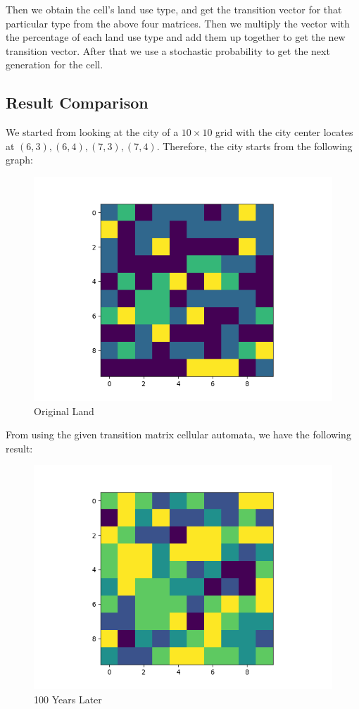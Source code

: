 \documentclass[a4paper,12pt]{report}
\begin{document}
\pagebreak
Then we obtain the cell's land use type, and get the transition vector for that particular type from the above four matrices. Then we multiply the vector with the percentage of each land use type and add them up together to get the new transition vector. After that we use a stochastic probability to get the next generation for the cell.  

\subsection{Result Comparison}

We started from looking at the city of a $10\times 10$ grid with the city center locates at $(6,3), (6,4), (7,3), (7,4)$. Therefore, the city starts from the following graph:

\begin{figure}[h]
\centering
\includegraphics[scale=0.6]{../output/Original.png}
\caption{Original Land}
\end{figure}

\pagebreak
From using the given transition matrix cellular automata, we have the following result:

\begin{figure}[h]
\centering
\includegraphics[scale=0.6]{../output/Gen-10.png}
\caption{100 Years Later}
\end{figure}
\end{document}
